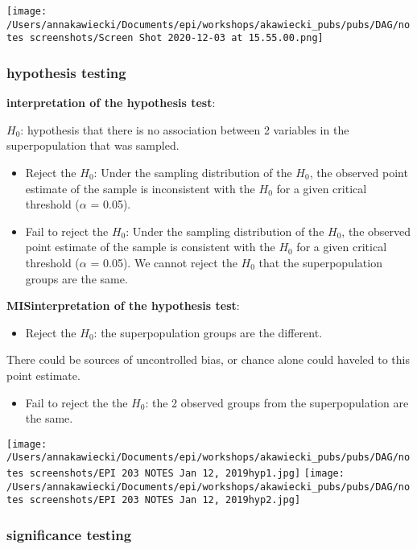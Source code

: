 \documentclass[
]{article}
\providecommand{\tightlist}{%
  \setlength{\itemsep}{0pt}\setlength{\parskip}{0pt}}
\begin{document}
\texttt{[image: /Users/annakawiecki/Documents/epi/workshops/akawiecki\_pubs/pubs/DAG/notes screenshots/Screen Shot 2020-12-03 at 15.55.00.png]}

\hypertarget{hypothesis-testing}{%
\subsubsection{hypothesis testing}\label{hypothesis-testing}}

\textbf{interpretation of the hypothesis test}:

\(H_0\): hypothesis that there is no association between 2 variables in
the superpopulation that was sampled.

\begin{itemize}
\item
  Reject the \(H_0\): Under the sampling distribution of the \(H_0\),
  the observed point estimate of the sample is inconsistent with the
  \(H_0\) for a given critical threshold (\(\alpha\) = 0.05).
\item
  Fail to reject the \(H_0\): Under the sampling distribution of the
  \(H_0\), the observed point estimate of the sample is consistent with
  the \(H_0\) for a given critical threshold (\(\alpha\) = 0.05). We
  cannot reject the \(H_0\) that the superpopulation groups are the
  same.
\end{itemize}

\textbf{MISinterpretation of the hypothesis test}:

\begin{itemize}
\tightlist
\item
  Reject the \(H_0\): the superpopulation groups are the different.
\end{itemize}

There could be sources of uncontrolled bias, or chance alone could
haveled to this point estimate.

\begin{itemize}
\tightlist
\item
  Fail to reject the the \(H_0\): the 2 observed groups from the
  superpopulation are the same.
\end{itemize}

\texttt{[image: /Users/annakawiecki/Documents/epi/workshops/akawiecki\_pubs/pubs/DAG/notes screenshots/EPI 203 NOTES Jan 12, 2019hyp1.jpg]}
\texttt{[image: /Users/annakawiecki/Documents/epi/workshops/akawiecki\_pubs/pubs/DAG/notes screenshots/EPI 203 NOTES Jan 12, 2019hyp2.jpg]}

\hypertarget{significance-testing}{%
\subsubsection{significance testing}\label{significance-testing}}
\end{document}
